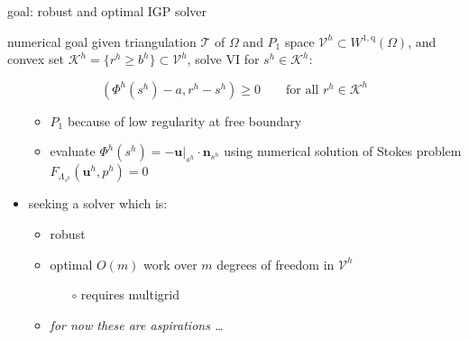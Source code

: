 \documentclass[usepdftitle=false]{beamer}
\newcommand{\bn}{\mathbf{n}}
\newcommand{\bu}{\mathbf{u}}
\newcommand{\ip}[2]{\left(#1,#2\right)}
\newcommand{\qq}{{\text{q}}}
\begin{document}
\begin{frame}{goal: robust and optimal IGP solver}

\begin{block}{numerical goal}
given triangulation $\mathcal{T}$ of $\Omega$ and $P_1$ space $\mathcal{V}^h \subset W^{1,\qq}(\Omega)$, and convex set $\mathcal{K}^h = \{r^h \ge b^h\} \subset \mathcal{V}^h$, solve VI for $s^h \in \mathcal{K}^h$:

$$\ip{\Phi^h(s^h) - a}{r^h - s^h} \ge 0 \qquad \text{for all $r^h \in \mathcal{K}^h$}$$
\end{block}

\begin{itemize}
\item[]
    \begin{itemize}
    \item $P_1$ because of low regularity at free boundary
    \item evaluate $\Phi^h(s^h)=-\bu|_{s^h}\cdot\bn_{s^h}$ using numerical solution of Stokes problem $F_{\Lambda_{s^h}}(\bu^h,p^h)=0$
    \end{itemize}
\item seeking a solver which is:
    \begin{itemize}
    \item \alert{robust}
    \item \alert{optimal} $O(m)$ work over $m$ degrees of freedom in $\mathcal{V}^h$
        \begin{itemize}
        \item[{\color{black} $\circ$}] requires multigrid
        \end{itemize}
    \item \emph{for now these are aspirations \dots}
    \end{itemize}
\end{itemize}
\end{frame}
\end{document}
